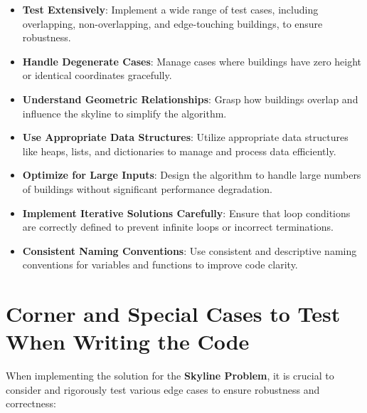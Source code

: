 \begin{itemize}
    \item \textbf{Test Extensively}: Implement a wide range of test cases, including overlapping, non-overlapping, and edge-touching buildings, to ensure robustness.
    
    \item \textbf{Handle Degenerate Cases}: Manage cases where buildings have zero height or identical coordinates gracefully.
    
    \item \textbf{Understand Geometric Relationships}: Grasp how buildings overlap and influence the skyline to simplify the algorithm.
    
    \item \textbf{Use Appropriate Data Structures}: Utilize appropriate data structures like heaps, lists, and dictionaries to manage and process data efficiently.
    
    \item \textbf{Optimize for Large Inputs}: Design the algorithm to handle large numbers of buildings without significant performance degradation.
    
    \item \textbf{Implement Iterative Solutions Carefully}: Ensure that loop conditions are correctly defined to prevent infinite loops or incorrect terminations.
    
    \item \textbf{Consistent Naming Conventions}: Use consistent and descriptive naming conventions for variables and functions to improve code clarity.
\end{itemize}

\section*{Corner and Special Cases to Test When Writing the Code}

When implementing the solution for the \textbf{Skyline Problem}, it is crucial to consider and rigorously test various edge cases to ensure robustness and correctness:

